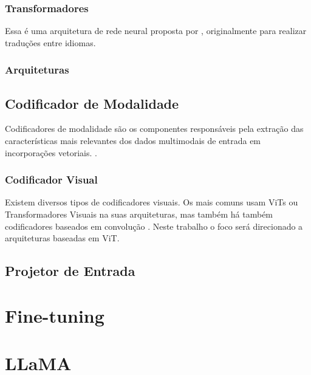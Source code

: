\subsubsection{Transformadores}

Essa é uma arquitetura de rede neural proposta por \textcite{transformers_the_og}, originalmente para realizar traduções entre idiomas.

\subsubsection{Arquiteturas}

\subsection{Codificador de Modalidade}

Codificadores de modalidade são os componentes responsáveis pela extração das características mais relevantes dos dados multimodais de entrada em incorporações vetoriais.
\cite{mllm_survey_2024}.

\subsubsection{Codificador Visual}

Existem diversos tipos de codificadores visuais. Os mais comuns usam \acp{ViT} ou Transformadores Visuais na suas arquiteturas, mas também há também codificadores
baseados em convolução \cite{mllm_survey_2023}. Neste trabalho o foco será direcionado a arquiteturas baseadas em \ac{ViT}.


\subsection{Projetor de Entrada}

\section{Fine-tuning}

\section{LLaMA}
